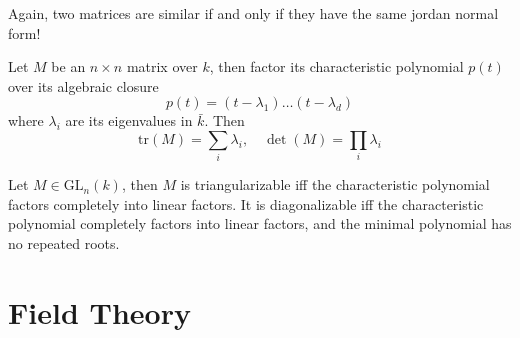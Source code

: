 \documentclass[openany]{book}
\newcommand{\tr}{\text{tr}}
\begin{document}
\begin{warn}
    Again, two matrices are similar if and only if they have the same jordan normal form!
\end{warn}


\begin{warn}
    Let $M$ be an $n\times n$ matrix over $k$, then factor its characteristic polynomial $p(t)$ over its algebraic closure 
    \begin{equation*}
        p(t)=(t-\lambda_1)\dots(t-\lambda_d)
    \end{equation*}
    where $\lambda_i$ are its eigenvalues in $\bar{k}$. Then 
    \begin{equation*}
        \tr(M)=\sum_{i}\lambda_i, \quad \det(M)=\prod_i\lambda_i
    \end{equation*}

\end{warn}


\begin{prop}
    Let $M\in\text{GL}_n(k)$, then $M$ is triangularizable iff the characteristic polynomial factors completely into linear factors. It is diagonalizable iff the characteristic polynomial completely factors into linear factors, and the minimal polynomial has no repeated roots.
\end{prop}
























































\chapter{Field Theory}
\end{document}
